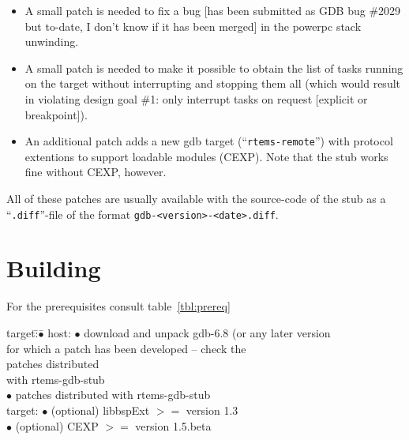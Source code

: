 \documentclass{article}
\newcommand{\cmd}[1]{{\tt #1}}
\newcommand{\bul}{$\bullet$\hspace{.5em}}
\begin{document}
\begin{itemize}
\item
 A small patch is needed to fix a bug [has been submitted
 as GDB bug \#2029
 but to-date, I don't know if it has been merged] in the
 powerpc stack unwinding.
\item
 A small patch is needed to make it possible to obtain
 the list of tasks running on the target without interrupting
 and stopping them all
 (which would result in violating design goal \#1: only
 interrupt tasks on request [explicit or breakpoint]).
\item
 An additional patch adds a new gdb target (``\cmd{rtems-remote}'')
 with protocol
 extentions to support loadable modules (CEXP). Note that
 the stub works fine without CEXP, however.
\end{itemize}

\noindent
All of these patches are usually available with the source-code
of the stub as a ``{\tt .diff}''-file of the format
{\tt gdb-<version>-<date>.diff}.

\section{Building}
For the prerequisites consult table~\ref{tbl:prereq}
\begin{table}
\begin{center}
\begin{tabbing}
target:\hspace{4em}\=\bul\= \kill
host:  \> \bul \> download and unpack gdb-6.8 (or any later version \\
       \>      \> for which a patch has been developed -- check the \\
	   \>      \>  patches distributed \\
	   \>      \> with rtems-gdb-stub \\
	   \> \bul \> patches distributed with rtems-gdb-stub \\
target:\> \bul \> (optional) libbspExt $>=$ version 1.3  \\
       \> \bul \> (optional) CEXP $>=$ version 1.5.beta
\end{tabbing}
\caption{Prerequisites}
\label{tbl:prereq}
\end{center}
\end{table}
\end{document}
